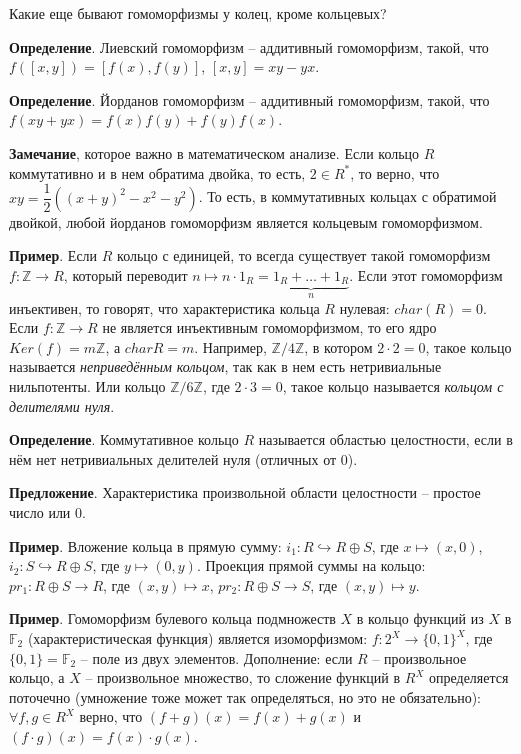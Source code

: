 \documentclass[a4paper]{book}
\begin{document}
Какие еще бывают гомоморфизмы у колец, кроме кольцевых? 

\textbf{Определение}. Лиевский гомоморфизм -- аддитивный гомоморфизм, такой, что $f([x,y]) = [f(x),f(y)]$, $[x,y] = xy - yx$. 

\textbf{Определение}. Йорданов гомоморфизм -- аддитивный гомоморфизм, такой, что $f(xy+yx)=f(x)f(y)+f(y)f(x)$. 

\textbf{Замечание}, которое важно в математическом анализе. Если кольцо $R$ коммутативно и в нем обратима двойка, то есть, $2\in R^*$, то верно, что $xy = \dfrac{1}{2} ((x+y)^2 - x^2 - y^2)$. То есть, в коммутативных кольцах с обратимой двойкой, любой йорданов гомоморфизм является кольцевым гомоморфизмом. 


\textbf{Пример}. Если $R$ кольцо с единицей, то всегда существует такой гомоморфизм $f:\mathbb{Z}\rightarrow R$, который переводит $n \mapsto n \cdot 1_R = \underbrace{1_R + \dots + 1_R}_n$. Если этот гомоморфизм инъективен, то говорят, что характеристика кольца $R$ нулевая: $char(R) = 0$. 
Если $f:\mathbb{Z}\rightarrow R$ не является инъективным гомоморфизмом, то его ядро $Ker(f) = m\mathbb{Z}$, а $charR = m$. Например, $\mathbb{Z}/4\mathbb{Z}$, в котором $2\cdot 2 = 0$, такое кольцо называется \textit{неприведённым кольцом}, так как в нем есть нетривиальные нильпотенты. Или кольцо $\mathbb{Z}/6\mathbb{Z}$, где $2\cdot 3 = 0$, такое кольцо называется \textit{кольцом с делителями нуля}. 

\textbf{Определение}. Коммутативное кольцо $R$ называется областью целостности, если в нём нет нетривиальных делителей нуля (отличных от $0$). 

\textbf{Предложение}. Характеристика произвольной области целостности -- простое число или 0. 


\textbf{Пример}. Вложение кольца в прямую сумму: $i_1: R \hookrightarrow R\oplus S$, где $x \mapsto (x,0)$, $i_2: S\hookrightarrow R\oplus S$, где $y \mapsto (0,y)$. Проекция прямой суммы на кольцо: $pr_1: R\oplus S\rightarrow R$, где $(x,y) \mapsto x$, $pr_2: R\oplus S\rightarrow S$, где $(x,y) \mapsto y$. 

\textbf{Пример}. Гомоморфизм булевого кольца подмножеств $X$ в кольцо функций из $X$ в $\mathbb{F}_2$ (характеристическая функция) является изоморфизмом: $f:2^X \rightarrow \{0,1\}^X$, где $\{0,1\} = \mathbb{F}_2$ -- поле из двух элементов. Дополнение: если $R$ -- произвольное кольцо, а $X$ -- произвольное множество, то сложение функций в $R^X$ определяется поточечно (умножение тоже может так определяться, но это не обязательно): $\forall f,g\in R^X$ верно, что $(f+g)(x) = f(x) + g(x)$ и $(f\cdot g)(x) = f(x)\cdot g(x)$. 
\end{document}
